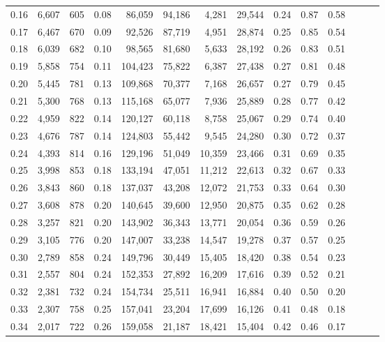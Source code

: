 \begin{tabular}{rrrrrrrrrrrrrr}
0.16 &  6,607 &  605 &  0.08 &   86,059 &   94,186 &   4,281 &  29,544 &  0.24 &  0.87 &      0.58 \\
0.17 &  6,467 &  670 &  0.09 &   92,526 &   87,719 &   4,951 &  28,874 &  0.25 &  0.85 &      0.54 \\
0.18 &  6,039 &  682 &  0.10 &   98,565 &   81,680 &   5,633 &  28,192 &  0.26 &  0.83 &      0.51 \\
0.19 &  5,858 &  754 &  0.11 &  104,423 &   75,822 &   6,387 &  27,438 &  0.27 &  0.81 &      0.48 \\
0.20 &  5,445 &  781 &  0.13 &  109,868 &   70,377 &   7,168 &  26,657 &  0.27 &  0.79 &      0.45 \\
0.21 &  5,300 &  768 &  0.13 &  115,168 &   65,077 &   7,936 &  25,889 &  0.28 &  0.77 &      0.42 \\
0.22 &  4,959 &  822 &  0.14 &  120,127 &   60,118 &   8,758 &  25,067 &  0.29 &  0.74 &      0.40 \\
0.23 &  4,676 &  787 &  0.14 &  124,803 &   55,442 &   9,545 &  24,280 &  0.30 &  0.72 &      0.37 \\
0.24 &  4,393 &  814 &  0.16 &  129,196 &   51,049 &  10,359 &  23,466 &  0.31 &  0.69 &      0.35 \\
0.25 &  3,998 &  853 &  0.18 &  133,194 &   47,051 &  11,212 &  22,613 &  0.32 &  0.67 &      0.33 \\
0.26 &  3,843 &  860 &  0.18 &  137,037 &   43,208 &  12,072 &  21,753 &  0.33 &  0.64 &      0.30 \\
0.27 &  3,608 &  878 &  0.20 &  140,645 &   39,600 &  12,950 &  20,875 &  0.35 &  0.62 &      0.28 \\
0.28 &  3,257 &  821 &  0.20 &  143,902 &   36,343 &  13,771 &  20,054 &  0.36 &  0.59 &      0.26 \\
0.29 &  3,105 &  776 &  0.20 &  147,007 &   33,238 &  14,547 &  19,278 &  0.37 &  0.57 &      0.25 \\
0.30 &  2,789 &  858 &  0.24 &  149,796 &   30,449 &  15,405 &  18,420 &  0.38 &  0.54 &      0.23 \\
0.31 &  2,557 &  804 &  0.24 &  152,353 &   27,892 &  16,209 &  17,616 &  0.39 &  0.52 &      0.21 \\
0.32 &  2,381 &  732 &  0.24 &  154,734 &   25,511 &  16,941 &  16,884 &  0.40 &  0.50 &      0.20 \\
0.33 &  2,307 &  758 &  0.25 &  157,041 &   23,204 &  17,699 &  16,126 &  0.41 &  0.48 &      0.18 \\
0.34 &  2,017 &  722 &  0.26 &  159,058 &   21,187 &  18,421 &  15,404 &  0.42 &  0.46 &      0.17 \\

\end{tabular}

